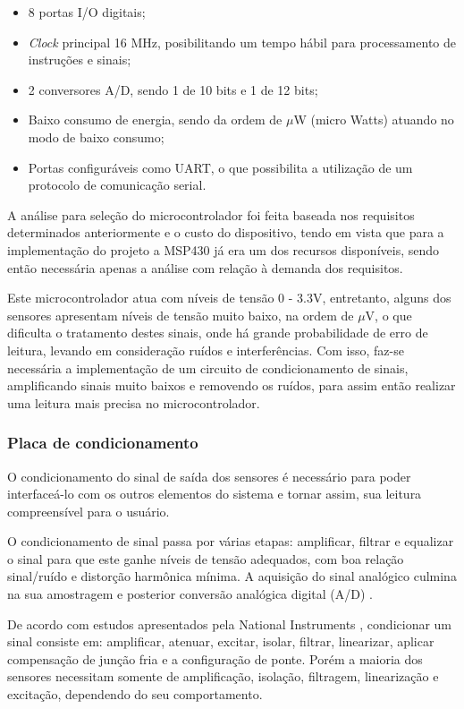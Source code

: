 \begin{itemize}
	\item 8 portas I/O digitais;
	\item \textit{Clock} principal 16 MHz, posibilitando um tempo hábil para processamento de instruções e sinais;
	\item 2 conversores A/D, sendo 1 de 10 bits e 1 de 12 bits;
	\item Baixo consumo de energia, sendo da ordem de $\mu$W (micro Watts) atuando no modo de baixo consumo;
	\item Portas configuráveis como UART, o que possibilita a utilização de um protocolo de comunicação serial.
\end{itemize}

A análise para seleção do microcontrolador foi feita baseada nos requisitos determinados anteriormente e o custo do dispositivo, tendo em vista que para a implementação do projeto a MSP430 já era um dos recursos disponíveis, sendo então necessária apenas a análise com relação à demanda dos requisitos. 

Este microcontrolador atua com níveis de tensão 0 - 3.3V, entretanto, alguns dos sensores apresentam níveis de tensão muito baixo, na ordem de $\mu$V, o que dificulta o tratamento destes sinais, onde há grande probabilidade de erro de leitura, levando em consideração ruídos e interferências. Com isso, faz-se necessária a implementação de um circuito de condicionamento de sinais, amplificando sinais muito baixos e removendo os ruídos, para assim então realizar uma leitura mais precisa no microcontrolador.

\subsubsection{Placa de condicionamento}

O condicionamento do sinal de saída dos sensores é necessário para poder interfaceá-lo com os outros elementos do sistema e tornar assim, sua leitura compreensível para o usuário.

O condicionamento de sinal passa por várias etapas: amplificar, filtrar e equalizar o sinal para que este ganhe níveis de tensão adequados, com boa relação sinal/ruído e distorção harmônica mínima. A aquisição do sinal analógico culmina na sua amostragem e posterior conversão analógica digital (A/D) \cite{SMAR}.

De acordo com estudos apresentados pela National Instruments \cite{national01}, condicionar um sinal consiste em: amplificar, atenuar, excitar, isolar, filtrar, linearizar, aplicar compensação de junção fria e a configuração de ponte. Porém a maioria dos sensores necessitam somente de amplificação, isolação, filtragem, linearização e excitação, dependendo do seu comportamento.

